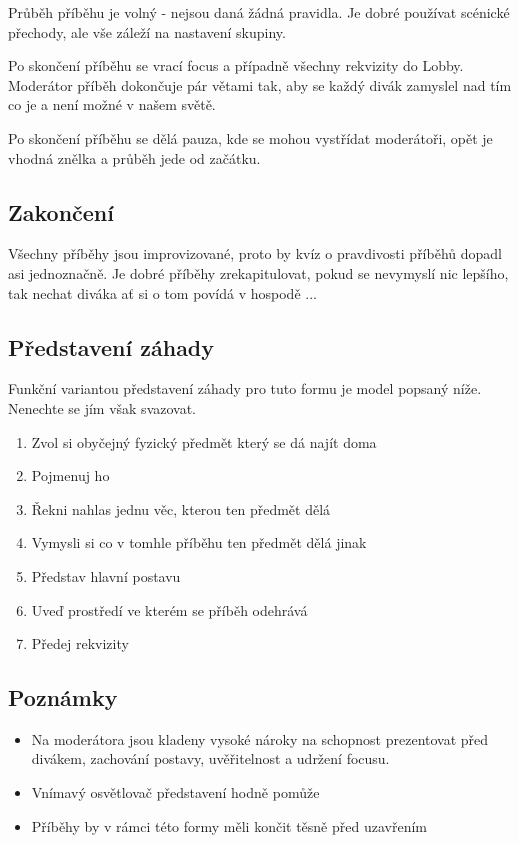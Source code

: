 Průběh příběhu je volný - nejsou daná žádná pravidla. Je dobré používat scénické přechody, ale vše záleží na nastavení skupiny. 
 
Po skončení příběhu se vrací focus a případně všechny rekvizity do Lobby. Moderátor příběh dokončuje pár větami tak, aby se každý divák zamyslel nad tím co je a není možné v našem světě.  
 
Po skončení příběhu se dělá pauza, kde se mohou vystřídat moderátoři, opět je vhodná znělka a průběh jede od začátku. 
 
\subsection{ Zakončení }  
Všechny příběhy jsou improvizované, proto by kvíz o pravdivosti příběhů dopadl asi jednoznačně. Je dobré příběhy zrekapitulovat, pokud se nevymyslí nic lepšího, tak nechat diváka ať si o tom povídá v hospodě ... 
 
\subsection{ Představení záhady }  
Funkční variantou představení záhady pro tuto formu je model popsaný níže. Nenechte se jím však svazovat. 
 
\begin{enumerate}
\item  Zvol si obyčejný fyzický předmět který se dá najít doma
\item  Pojmenuj ho
\item  Řekni nahlas jednu věc, kterou ten předmět dělá
\item  Vymysli si co v tomhle příběhu ten předmět dělá jinak
\item  Představ hlavní postavu
\item  Uveď prostředí ve kterém se příběh odehrává
\item  Předej rekvizity
\end{enumerate}
 
\subsection{ Poznámky } \begin{itemize}
\item  Na moderátora jsou kladeny vysoké nároky na schopnost prezentovat před divákem, zachování postavy, uvěřitelnost a udržení focusu.
\item  Vnímavý osvětlovač představení hodně pomůže
\item  Příběhy by v rámci této formy měli končit těsně před uzavřením
\end{itemize}
 
 

